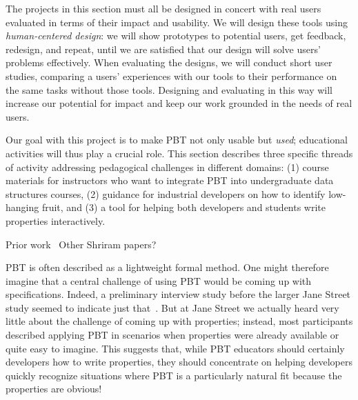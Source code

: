 
\bigskip
{}
The projects in this section must all be designed in concert with real users
evaluated in terms of their impact and usability. We will design these tools
using {\em human-centered design}: we will show prototypes to potential users,
get feedback, redesign, and repeat, until we are satisfied that our design will
solve users' problems effectively. When evaluating the designs, we will conduct
short user studies, comparing a users' experiences with our tools to their
performance on the same tasks without those tools. Designing and evaluating in
this way will increase our potential for impact and keep our work grounded in
the needs of real users.


Our goal with this project is to make PBT not only usable but {\em
  used}; educational activities will thus play a crucial role.  This
section describes three specific threads of activity addressing pedagogical
challenges in different domains:
(1) course materials for instructors who want to integrate PBT into
undergraduate data structures courses,
%
(2) guidance for
industrial developers on how to identify low-hanging fruit, and
%
(3) a
tool for helping both developers and students write properties
interactively.

\ifdraft
Prior work~\cite{wrenn2021using,nelson2021automated} Other Shriram papers?
\fi



PBT is often described as a lightweight formal method.  One
might therefore imagine that a central challenge of using PBT would be
coming up with specifications. Indeed, a preliminary interview
study before the larger Jane Street study seemed to indicate just
that~\cite{ref:goldstein2022some}. But at
Jane Street we actually heard very little about the challenge of coming up with
properties; instead, most participants described applying PBT in scenarios when
properties were already available or quite easy to imagine. This suggests that,
while PBT educators should certainly developers how to
write properties, they should concentrate on
helping developers quickly recognize situations where PBT is a particularly
natural fit because the properties are obvious!

